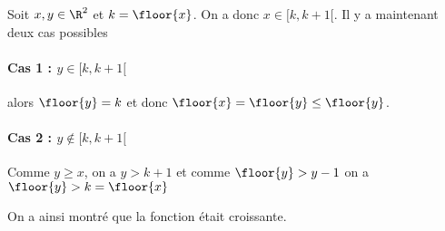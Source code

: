 
\begin{correction}

Soit $x,y\in \R^2$ et  $k=\floor{x}$. On a donc $x\in [k,k+1[$. Il y a maintenant deux cas possibles 
\paragraph{Cas 1 : $y\in  [k,k+1[$}
alors $\floor{y}=k$ et donc $\floor{x}=\floor{y}\leq \floor{y}$. 

\paragraph{Cas 2 : $y\notin  [k,k+1[$}
Comme $y\geq x$, on a $y>k+1$ et comme $\floor{y}>y-1$ on a 
$\floor{y} >k =\floor{x}$

On a ainsi montré que la fonction était croissante. 






\end{correction}